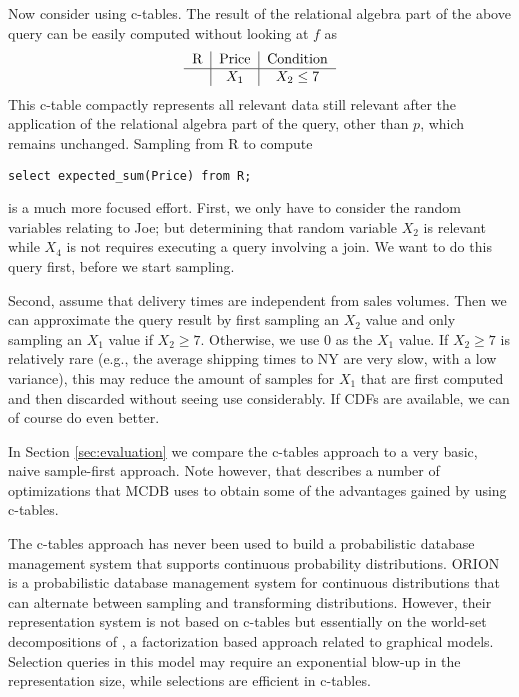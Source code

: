 \begin{example}
Now consider using c-tables. The result of the relational algebra part of the
above query can be easily computed without looking at $f$ as
\[
\begin{tabular}{c|c|c}
R & Price & Condition \\
\hline
& $X_1$ & $X_2 \le 7$ \\
\end{tabular}
\]
This c-table compactly represents all relevant data still relevant after the
application of the relational algebra part of the query, other than $p$,
which remains unchanged.
Sampling from R to compute
\begin{verbatim}
select expected_sum(Price) from R;
\end{verbatim}
is a much more focused effort.
First, we only have to consider the random variables relating to Joe;
but determining that random variable $X_2$ is relevant while $X_4$
is not requires
executing a query involving a join. We want to do this query first, before
we start sampling.

Second, assume that delivery times are
independent from sales volumes. Then we can approximate the
query result
by first sampling an $X_2$ value and only sampling an $X_1$ value if $X_2 \ge 7$.
Otherwise, we use $0$ as the $X_1$ value.
If $X_2 \ge 7$ is relatively rare (e.g., the average shipping times to NY are
very slow, with a low variance), this may reduce the amount of samples
for $X_1$ that are first computed and then discarded without seeing use
considerably.
If CDFs are available, we can of course do even better.

In Section \ref{sec:evaluation} we compare the c-tables approach to a very basic, 
naive sample-first approach.  Note however, that \cite{MCDB} describes a number of 
optimizations that MCDB uses to obtain some of the advantages gained by using c-tables.
%
\punto
\end{example}


The  c-tables  approach has  never  been used  to build  a
probabilistic  database  management  system that  supports  continuous
probability  distributions.
%
ORION \cite{ORION} is a probabilistic database management system for
continuous distributions that can alternate between sampling
and transforming distributions. However, their representation
system is not based on c-tables but essentially on the
world-set decompositions of \cite{AKO07WSD}, a factorization
based approach related to graphical models.
Selection queries in this model may require an exponential blow-up in the
representation size, while selections are efficient in c-tables.


